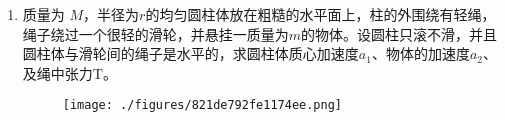 
\begin{enumerate}
\item 质量为 $M$，半径为$r$的均匀圆柱体放在粗糙的水平面上，柱的外围绕有轻绳，绳子绕过一个很轻的滑轮，并悬挂一质量为$m $的物体。设圆柱只滚不滑，并且圆柱体与滑轮间的绳子是水平的，求圆柱体质心加速度$ a_1$、物体的加速度$ a_2$、及绳中张力T。
\begin{figure}[ht]
\centering
\texttt{[image: ./figures/821de792fe1174ee.png]}
\caption{} \label{fig_SD05_1}
\end{figure}
\end{enumerate}